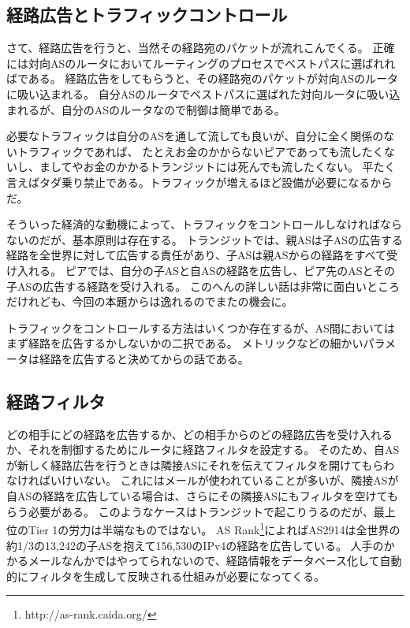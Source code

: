 \subsection{経路広告とトラフィックコントロール}

さて、経路広告を行うと、当然その経路宛のパケットが流れこんでくる。
正確には対向ASのルータにおいてルーティングのプロセスでベストパスに選ばれればである。
経路広告をしてもらうと、その経路宛のパケットが対向ASのルータに吸い込まれる。
自分ASのルータでベストパスに選ばれた対向ルータに吸い込まれるが、自分のASのルータなので制御は簡単である。

必要なトラフィックは自分のASを通して流しても良いが、自分に全く関係のないトラフィックであれば、
たとえお金のかからないピアであっても流したくないし、ましてやお金のかかるトランジットには死んでも流したくない。
平たく言えばタダ乗り禁止である。トラフィックが増えるほど設備が必要になるからだ。

そういった経済的な動機によって、トラフィックをコントロールしなければならないのだが、基本原則は存在する。
トランジットでは、親ASは子ASの広告する経路を全世界に対して広告する責任があり、子ASは親ASからの経路をすべて受け入れる。
ピアでは、自分の子ASと自ASの経路を広告し、ピア先のASとその子ASの広告する経路を受け入れる。
このへんの詳しい話は非常に面白いところだけれども、今回の本題からは逸れるのでまたの機会に。

トラフィックをコントロールする方法はいくつか存在するが、AS間においてはまず経路を広告するかしないかの二択である。
メトリックなどの細かいパラメータは経路を広告すると決めてからの話である。

\subsection{経路フィルタ}

どの相手にどの経路を広告するか、どの相手からのどの経路広告を受け入れるか、それを制御するためにルータに経路フィルタを設定する。
そのため、自ASが新しく経路広告を行うときは隣接ASにそれを伝えてフィルタを開けてもらわなければいけいない。
これにはメールが使われていることが多いが、隣接ASが自ASの経路を広告している場合は、さらにその隣接ASにもフィルタを空けてもらう必要がある。
このようなケースはトランジットで起こりうるのだが、最上位のTier 1の労力は半端なものではない。
AS Rank\footnote{http://as-rank.caida.org/}によればAS2914は全世界の約1/3の13,242の子ASを抱えて156,530のIPv4の経路を広告している。
人手のかかるメールなんかではやってられないので、経路情報をデータベース化して自動的にフィルタを生成して反映される仕組みが必要になってくる。

